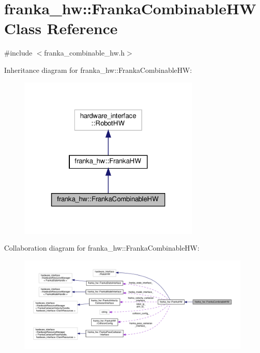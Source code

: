 \hypertarget{classfranka__hw_1_1_franka_combinable_h_w}{}\section{franka\+\_\+hw\+:\+:Franka\+Combinable\+HW Class Reference}
\label{classfranka__hw_1_1_franka_combinable_h_w}


{\ttfamily \#include $<$franka\+\_\+combinable\+\_\+hw.\+h$>$}



Inheritance diagram for franka\+\_\+hw\+:\+:Franka\+Combinable\+HW\+:
\nopagebreak
\begin{figure}[H]
\begin{center}
\leavevmode
\includegraphics[width=247pt]{classfranka__hw_1_1_franka_combinable_h_w__inherit__graph}
\end{center}
\end{figure}


Collaboration diagram for franka\+\_\+hw\+:\+:Franka\+Combinable\+HW\+:
\nopagebreak
\begin{figure}[H]
\begin{center}
\leavevmode
\includegraphics[width=350pt]{classfranka__hw_1_1_franka_combinable_h_w__coll__graph}
\end{center}
\end{figure}
